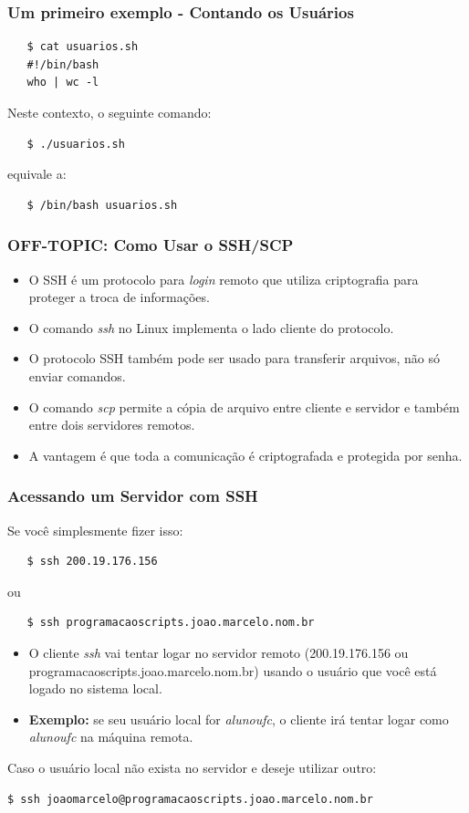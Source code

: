 \documentclass{beamer}
\begin{document}
\begin{frame}[fragile]
   \frametitle{Um primeiro exemplo - Contando os Usuários}
   \begin{verbatim}
   $ cat usuarios.sh 
   #!/bin/bash
   who | wc -l 
   \end{verbatim}
   Neste contexto, o seguinte comando: 
   \begin{verbatim}
   $ ./usuarios.sh
   \end{verbatim}
   equivale a:
   \begin{verbatim}
   $ /bin/bash usuarios.sh
   \end{verbatim}
\end{frame}

\begin{frame}
   \frametitle{OFF-TOPIC: Como Usar o SSH/SCP}
   \begin{itemize}
      \item O SSH é um protocolo para \textit{login} remoto que utiliza criptografia para proteger a troca de informações.
      \item O comando \textit{ssh} no Linux implementa o lado cliente do protocolo.	
      \item O protocolo SSH também pode ser usado para transferir arquivos, não só enviar comandos.
      \item O comando \textit{scp} permite a cópia de arquivo entre cliente e servidor e também entre dois servidores remotos.
      \item A vantagem é que toda a comunicação é criptografada e protegida por senha.
   \end{itemize}
\end{frame}

\begin{frame}[fragile]
   \frametitle{Acessando um Servidor com SSH}
   Se você simplesmente fizer isso:
   \begin{verbatim}
   $ ssh 200.19.176.156
   \end{verbatim}
   ou
   \begin{verbatim}
   $ ssh programacaoscripts.joao.marcelo.nom.br
   \end{verbatim}
   \begin{itemize}
      \item O cliente \textit{ssh} vai tentar logar no servidor remoto (200.19.176.156 ou programacaoscripts.joao.marcelo.nom.br) usando o usuário que você está logado no sistema local.
      \item \textbf{Exemplo:} se seu usuário local for \textit{alunoufc}, o cliente irá tentar logar como \textit{alunoufc} na máquina remota.
   \end{itemize}

   Caso o usuário local não exista no servidor e deseje utilizar outro:
   \begin{verbatim}
$ ssh joaomarcelo@programacaoscripts.joao.marcelo.nom.br
   \end{verbatim}
\end{frame}
\end{document}
